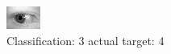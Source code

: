 \begin{figure}[h!]
\begin{center}
\includegraphics[width=0.60\columnwidth]{figures/ID700_class_3_target_4.png}
\end{center}
\caption{ Classification: 3 actual target: 4}
\label{fig:ID700_class_3_target_4}
\end{figure}
